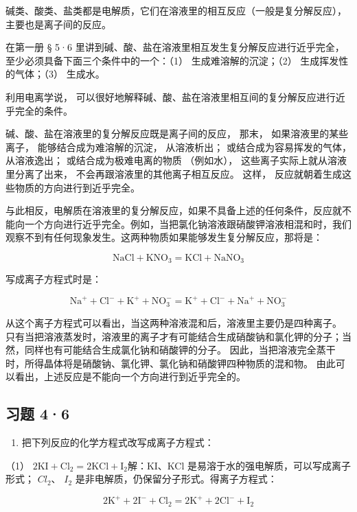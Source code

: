 碱类、酸类、盐类都是电解质，它们在溶液里的相互反应（一般是复分解反应），主要也是离子间的反应。

在第一册 § 5·6
里讲到碱、酸、盐在溶液里相互发生复分解反应进行近乎完全，至少必须具备下面三个条件中的一个：（1）
生成难溶解的沉淀；（2） 生成挥发性的气体；（3） 生成水。

利用电离学说，
可以很好地解释碱、酸、盐在溶液里相互间的复分解反应进行近乎完全的条件。

碱、酸、盐在溶液里的复分解反应既是离子间的反应， 那末，
如果溶液里的某些离子， 能够结合成为难溶解的沉淀， 从溶液析出；
或结合成为容易挥发的气体， 从溶液逸出； 或结合成为极难电离的物质
（例如水）， 这些离子实际上就从溶液里分离了出来，
不会再跟溶液里的其他离子相互反应。 这样，
反应就朝着生成这些物质的方向进行到近乎完全。

与此相反，电解质在溶液里的复分解反应，如果不具备上述的任何条件，反应就不能向一个方向进行近乎完全。例如，当把氯化钠溶液跟硝酸钾溶液相混和时，我们观察不到有任何现象发生。这两种物质如果能够发生复分解反应，那将是：

\[
\mathrm{NaCl} + \mathrm{KNO} _ {3} = \mathrm{KCl} + \mathrm{NaNO} _ {3}
\]

写成离子方程式时是：

\[
\mathrm{Na} ^ {+} + \mathrm{Cl} ^ {-} + \mathrm{K} ^ {+} + \mathrm{NO} _ {3} ^ {-} = \mathrm{K} ^ {+} + \mathrm{Cl} ^ {-} + \mathrm{Na} ^ {+} + \mathrm{NO} _ {3} ^ {-}
\]

从这个离子方程式可以看出，当这两种溶液混和后，溶液里主要仍是四种离子。
只有当把溶液蒸发时，溶液里的离子才有可能结合生成硝酸钠和氯化钾的分子；当然，同样也有可能结合生成氯化钠和硝酸钾的分子。
因此，当把溶液完全蒸干时，所得晶体将是硝酸钠、氯化钾、氯化钠和硝酸钾四种物质的混和物。
由此可以看出，上述反应是不能向一个方向进行到近乎完全的。

\subsection{习题 4·6}

\begin{enumerate}
\item
  把下列反应的化学方程式改写成离子方程式：
\end{enumerate}

（1）
\(2\mathrm{KI} + \mathrm{Cl}_2 = 2\mathrm{KCl} + \mathrm{I}_2\)解：KI、KCl
是易溶于水的强电解质，可以写成离子形式； \(Cl_{2}\)、 \(I_{2}\)
是非电解质，仍保留分子形式。得离子方程式：

\[
2 \mathrm{K} ^ {+} + 2 \mathrm{I} ^ {-} + \mathrm{Cl} _ {2} = 2 \mathrm{K} ^ {+} + 2 \mathrm{Cl} ^ {-} + \mathrm{I} _ {2}
\]

